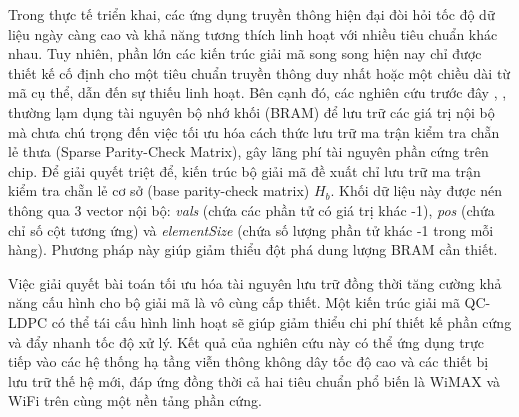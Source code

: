 \documentclass[12pt,a4paper,oneside]{book}
\begin{document}
Trong thực tế triển khai, các ứng dụng truyền thông hiện đại đòi hỏi tốc độ dữ liệu ngày càng cao và khả năng tương thích linh hoạt với nhiều tiêu chuẩn khác nhau. Tuy nhiên, phần lớn các kiến trúc giải mã song song hiện nay chỉ được thiết kế cố định cho một tiêu chuẩn truyền thông duy nhất hoặc một chiều dài từ mã cụ thể, dẫn đến sự thiếu linh hoạt. Bên cạnh đó, các nghiên cứu trước đây \cite{2}, \cite{3}, \cite{4} thường lạm dụng tài nguyên bộ nhớ khối (BRAM) để lưu trữ các giá trị nội bộ mà chưa chú trọng đến việc tối ưu hóa cách thức lưu trữ ma trận kiểm tra chẵn lẻ thưa (Sparse Parity-Check Matrix), gây lãng phí tài nguyên phần cứng trên chip. Để giải quyết triệt để, kiến trúc bộ giải mã đề xuất chỉ lưu trữ ma trận kiểm tra chẵn lẻ cơ sở (base parity-check matrix) $H_b$. Khối dữ liệu này được nén thông qua 3 vector nội bộ: \textit{vals} (chứa các phần tử có giá trị khác -1), \textit{pos} (chứa chỉ số cột tương ứng) và \textit{elementSize} (chứa số lượng phần tử khác -1 trong mỗi hàng). Phương pháp này giúp giảm thiểu đột phá dung lượng BRAM cần thiết. 

Việc giải quyết bài toán tối ưu hóa tài nguyên lưu trữ đồng thời tăng cường khả năng cấu hình cho bộ giải mã là vô cùng cấp thiết. Một kiến trúc giải mã QC-LDPC có thể tái cấu hình linh hoạt sẽ giúp giảm thiểu chi phí thiết kế phần cứng và đẩy nhanh tốc độ xử lý. Kết quả của nghiên cứu này có thể ứng dụng trực tiếp vào các hệ thống hạ tầng viễn thông không dây tốc độ cao và các thiết bị lưu trữ thế hệ mới, đáp ứng đồng thời cả hai tiêu chuẩn phổ biến là WiMAX và WiFi trên cùng một nền tảng phần cứng.
\end{document}
